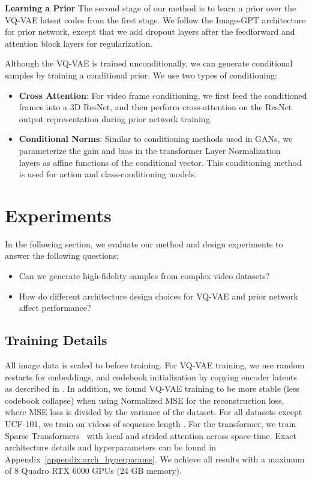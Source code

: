 \documentclass{article}
\begin{document}
\textbf{Learning a Prior}
The second stage of our method is to learn a prior over the VQ-VAE latent codes from the first stage. We follow the Image-GPT architecture for prior network, except that we add dropout layers after the feedforward and attention block layers for regularization.

Although the VQ-VAE is trained unconditionally, we can generate conditional samples by training a conditional prior. We use two types of conditioning:
\begin{itemize}
    \item \textbf{Cross Attention}: For video frame conditioning, we first feed the conditioned frames into a 3D ResNet, and then perform cross-attention on the ResNet output representation during prior network training.
    
    \item \textbf{Conditional Norms}: Similar to conditioning methods used in GANs, we parameterize the gain and bias in the transformer Layer Normalization~\citep{ba2016layer} layers as affine functions of the conditional vector. This conditioning method is used for action and class-conditioning models.
\end{itemize} 
\section{Experiments}

In the following section, we evaluate our method and design experiments to answer the following questions:
\begin{itemize}
    \item Can we generate high-fidelity samples from complex video datasets?
    \item How do different architecture design choices for VQ-VAE and prior network affect performance?
\end{itemize}

\subsection{Training Details}
All image data is scaled to  before training. For VQ-VAE training, we use random restarts for embeddings, and codebook initialization by copying encoder latents as described in \cite{dhariwal2020jukebox}. In addition, we found VQ-VAE training to be more stable (less codebook collapse) when using Normalized MSE for the reconstruction loss, where MSE loss is divided by the variance of the dataset. For all datasets except UCF-101, we train on  videos of sequence length . For the transformer, we train Sparse Transformers~\cite{child2019generating} with local and strided attention across space-time. Exact architecture details and hyperparameters can be found in Appendix~\ref{appendix:arch_hyperparams}. We achieve all results with a maximum of 8 Quadro RTX 6000 GPUs (24 GB memory). 
\end{document}
